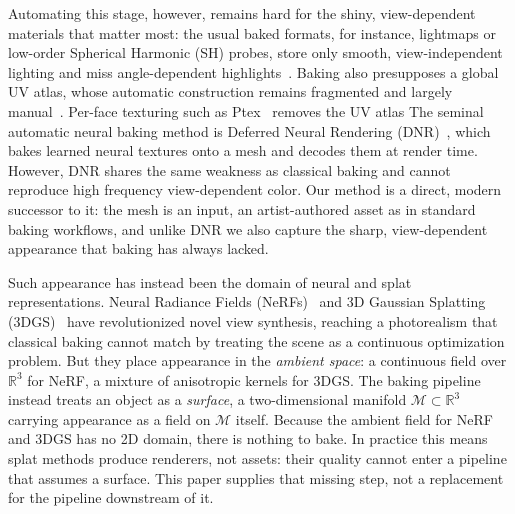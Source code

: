 Automating this stage, however, remains hard for the shiny, view-dependent materials that matter most:
the usual baked formats, for instance, lightmaps or low-order Spherical Harmonic (SH) probes, store only smooth, view-independent lighting and miss angle-dependent highlights~\citep{AllFrequency, curveSurfaces, nerfTexture}.
Baking also presupposes a global UV atlas, whose automatic construction remains fragmented and largely manual~\citep{Levy2002LSCM, poranne2017autocuts, li2018optcuts, srinivasan2024nuvo}. Per-face texturing such as Ptex~\citep{ptex} removes the UV atlas 
The seminal automatic neural baking method is Deferred Neural Rendering (DNR)~\citep{DNR}, which bakes learned neural textures onto a mesh and decodes them at render time.
However, DNR shares the same weakness as classical baking and cannot reproduce high frequency view-dependent color.
Our method is a direct, modern successor to it: the mesh is an input, an artist-authored asset as in standard baking workflows, and unlike DNR we also capture the sharp, view-dependent appearance that baking has always lacked.

Such appearance has instead been the domain of neural and splat representations. Neural Radiance
Fields (NeRFs)~\citep{NeRFVanilla} and 3D Gaussian Splatting (3DGS)~\citep{3DGS} have
revolutionized novel view synthesis, reaching a photorealism that classical baking cannot match by
treating the scene as a continuous optimization problem.
But they place appearance in the \emph{ambient space}: a continuous field over $\mathbb{R}^3$ for
NeRF, a mixture of anisotropic kernels for 3DGS.
The baking pipeline instead treats an object as a \emph{surface}, a two-dimensional manifold
$\mathcal{M}\subset\mathbb{R}^3$ carrying appearance as a field on $\mathcal{M}$ itself.
Because the ambient field for NeRF and 3DGS has no 2D domain, there is nothing to bake. In
practice this means splat methods produce renderers, not assets: their quality cannot enter a
pipeline that assumes a surface. This paper supplies that missing step, not a replacement for the
pipeline downstream of it.

